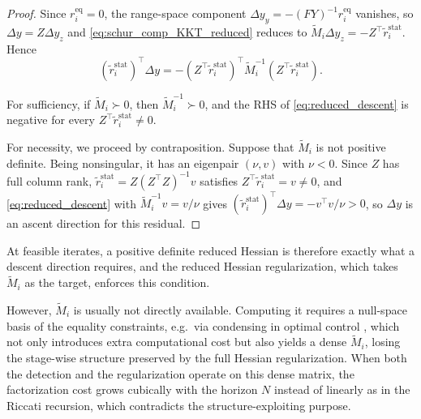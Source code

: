 \documentclass[class=scrbook, crop=false]{standalone}
\begin{document}
\begin{proof}
    Since $r_i^{\mathrm{eq}} = 0$, the range-space component $\Delta y_y = -(FY)^{-1} r_i^{\mathrm{eq}}$ vanishes,
    so $\Delta y = Z \Delta y_z$ and \eqref{eq:schur_comp_KKT_reduced} reduces to
    $\tilde{M}_i \Delta y_z = -Z^\top \tilde{r}_i^{\mathrm{stat}}$. Hence
    \begin{equation}
        \label{eq:reduced_descent}
        (\tilde{r}_i^{\mathrm{stat}})^\top \Delta y
        = -(Z^\top \tilde{r}_i^{\mathrm{stat}})^\top \tilde{M}_i^{-1} (Z^\top \tilde{r}_i^{\mathrm{stat}}).
    \end{equation}

    For sufficiency, if $\tilde{M}_i \succ 0$, then $\tilde{M}_i^{-1} \succ 0$,
    and the \gls{RHS} of \eqref{eq:reduced_descent} is negative for every $Z^\top \tilde{r}_i^{\mathrm{stat}} \neq 0$.

    For necessity, we proceed by contraposition.
    Suppose that $\tilde{M}_i$ is not positive definite.
    Being nonsingular, it has an eigenpair $(\nu, v)$ with $\nu < 0$.
    Since $Z$ has full column rank, $\tilde{r}_i^{\mathrm{stat}} = Z (Z^\top Z)^{-1} v$ satisfies $Z^\top \tilde{r}_i^{\mathrm{stat}} = v \neq 0$,
    and \eqref{eq:reduced_descent} with $\tilde{M}_i^{-1} v = v/\nu$ gives
    $(\tilde{r}_i^{\mathrm{stat}})^\top \Delta y = -v^\top v / \nu > 0$, so $\Delta y$ is an ascent direction for this residual.
\end{proof}

At feasible iterates, a positive definite reduced Hessian is therefore exactly what a descent direction requires,
and the reduced Hessian regularization, which takes $\tilde{M}_i$ as the target, enforces this condition.

However, $\tilde{M}_i$ is usually not directly available.
Computing it requires a null-space basis of the equality constraints,
e.g.\ via condensing in optimal control \cite{frisonEfficientImplementationPartial2016},
which not only introduces extra computational cost
but also yields a dense $\tilde{M}_i$, losing the stage-wise structure preserved by the full Hessian regularization.
When both the detection and the regularization operate on this dense matrix,
the factorization cost grows cubically with the horizon $N$ instead of linearly as in the Riccati recursion,
which contradicts the structure-exploiting purpose.
\end{document}
